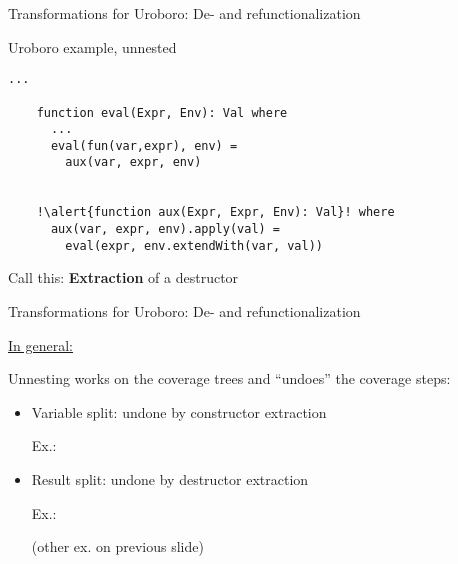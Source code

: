 \documentclass[xcolor=svgnames]{beamer}
\begin{document}
\begin{frame}[fragile]
  {Transformations for Uroboro: De- and refunctionalization}

  \begin{block}{Uroboro example, unnested}
    \begin{lstlisting}[escapechar=!]
    ...

    function eval(Expr, Env): Val where
      ...
      eval(fun(var,expr), env) =
        aux(var, expr, env)
        

    !\alert{function aux(Expr, Expr, Env): Val}! where
      aux(var, expr, env).apply(val) =
        eval(expr, env.extendWith(var, val))
    \end{lstlisting}
  \end{block}

  Call this: \textbf{Extraction} of a destructor
\end{frame}

\begin{frame}
  {Transformations for Uroboro: De- and refunctionalization}

\underline{In general:}

Unnesting works on the coverage trees and ``undoes'' the coverage steps:
\begin{itemize}
\item Variable split: undone by constructor extraction

Ex.:


\item Result split: undone by destructor extraction

Ex.:


(other ex. on previous slide)
\end{itemize}

\end{frame}
\end{document}
